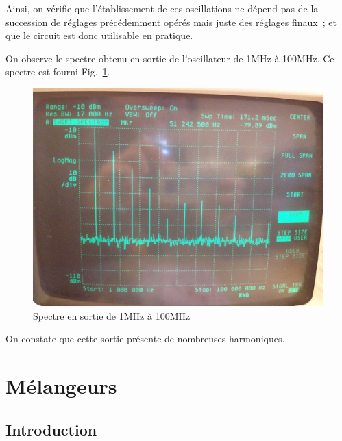 \documentclass{article}
\begin{document}
Ainsi, on vérifie que l'établissement de ces oscillations ne dépend pas de la succession de réglages précédemment opérés mais juste des réglages finaux~; et que le circuit est donc utilisable en pratique.



On observe le spectre obtenu en sortie de l'oscillateur de 1MHz à 100MHz. Ce spectre est fourni Fig.~\ref{fig:osc_quartz_spectre_large}.

\begin{figure}[h]
	\centering
	\includegraphics[width = 0.7\linewidth]{7_3_6_1MHz_100MHz.jpg}
	\caption{Spectre en sortie de 1MHz à 100MHz}
	\label{fig:osc_quartz_spectre_large}
\end{figure}

On constate que cette sortie présente de nombreuses harmoniques.





\section{Mélangeurs}

\subsection{Introduction}
\label{subsec:mel_intro}
\end{document}
